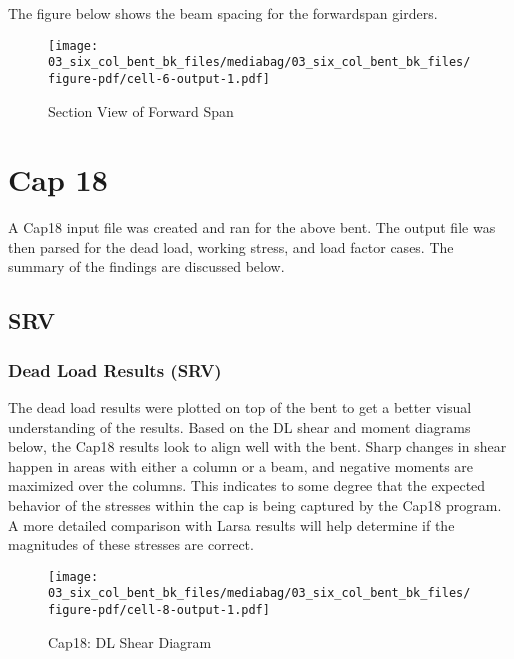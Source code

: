 \documentclass[
  letterpaper,
  DIV=11,
  numbers=noendperiod]{scrartcl}
\begin{document}
The figure below shows the beam spacing for the forwardspan girders.

\begin{figure}[H]

{\centering \texttt{[image: 03\_six\_col\_bent\_bk\_files/mediabag/03\_six\_col\_bent\_bk\_files/figure-pdf/cell-6-output-1.pdf]}

}

\caption{Section View of Forward Span}

\end{figure}%

\newpage{}

\section{Cap 18}\label{cap-18}

A Cap18 input file was created and ran for the above bent. The output
file was then parsed for the dead load, working stress, and load factor
cases. The summary of the findings are discussed below.

\subsection{SRV}\label{srv}

\subsubsection{Dead Load Results (SRV)}\label{dead-load-results-srv}

The dead load results were plotted on top of the bent to get a better
visual understanding of the results. Based on the DL shear and moment
diagrams below, the Cap18 results look to align well with the bent.
Sharp changes in shear happen in areas with either a column or a beam,
and negative moments are maximized over the columns. This indicates to
some degree that the expected behavior of the stresses within the cap is
being captured by the Cap18 program. A more detailed comparison with
Larsa results will help determine if the magnitudes of these stresses
are correct.

\begin{figure}[H]

{\centering \texttt{[image: 03\_six\_col\_bent\_bk\_files/mediabag/03\_six\_col\_bent\_bk\_files/figure-pdf/cell-8-output-1.pdf]}

}

\caption{Cap18: DL Shear Diagram}

\end{figure}%
\end{document}
